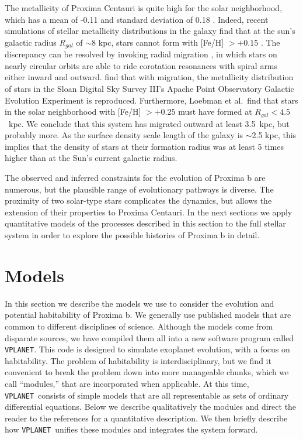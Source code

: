 \documentclass[preprint,12pt]{aastex}
\def\vplanet{\texttt{\footnotesize{VPLANET}}\xspace}
\begin{document}
The metallicity of Proxima Centauri is quite high for the solar
neighborhood, which has a mean of -0.11 and standard deviation of 0.18
\citep{AllendePrieto04}. Indeed, recent simulations of stellar
metallicity distributions in the galaxy find that at the sun's
galactic radius $R_{gal}$ of $\sim$8 kpc, stars cannot form with
[Fe/H] $> +0.15$ \citep{Loebman16}. The discrepancy can be resolved by
invoking radial migration \citep{SellwoodBinney02}, in which stars on
nearly circular orbits are able to ride corotation resonances with
spiral arms either inward and outward. \cite{Loebman16} find that with
migration, the metallicity distribution of stars in the Sloan Digital
Sky Survey III's Apache Point Observatory Galactic Evolution
Experiment \citep{Hayden15} is reproduced. Furthermore, Loebman et
al.\ find that stars in the solar neighborhood with [Fe/H] $> +0.25$
must have formed at $R_{gal} < 4.5$~kpc. We conclude that this system
has migrated outward at least 3.5~kpc, but probably more. As the surface
density scale length of the galaxy is $\sim$2.5 kpc, this implies that
the density of stars at their formation radius was at least 5 times
higher than at the Sun's current galactic radius.

The observed and inferred constraints for the evolution of Proxima b
are numerous, but the plausible range of evolutionary pathways is
diverse. The proximity of two solar-type stars complicates the
dynamics, but allows the extension of their properties to Proxima
Centauri. In the next sections we apply quantitative models of the
processes described in this section to the full stellar system in order to
explore the possible histories of Proxima b in detail.

\section{Models\label{sec:models}}

In this section we describe the models we use to consider the
evolution and potential habitability of Proxima b. We generally use
published models that are common to different disciplines of
science. Although the models come from disparate sources, we have
compiled them all into a new software program called \vplanet. This
code is designed to simulate exoplanet evolution, with a focus on
habitability. The problem of habitability is interdisciplinary, but we
find it convenient to break the problem down into more manageable
chunks, which we call ``modules,'' that are incorporated when
applicable. At this time, \vplanet~consists of simple models that are
all representable as sets of ordinary differential equations. Below we
describe qualitatively the modules and direct the reader to the
references for a quantitative description. We then briefly describe
how \vplanet~unifies these modules and integrates the system forward.
\end{document}
